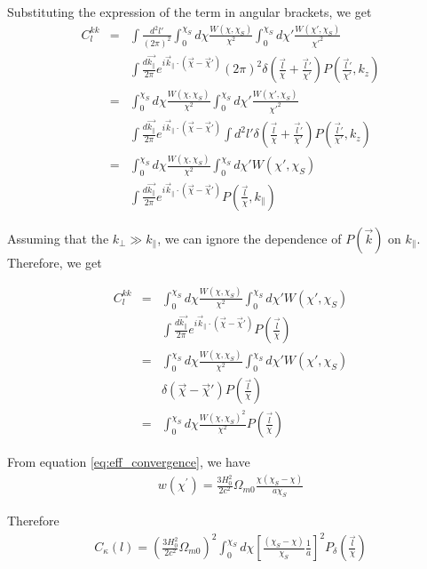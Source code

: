 \documentclass[12pt]{article}
\newcommand{\beqa}{\begin{eqnarray}}
\newcommand{\eeqa}{\end{eqnarray}}
\numberwithin{equation}{section}
\begin{document}
Substituting the expression of the term in angular brackets, we get
\begin{eqnarray}
C_l^{kk} &=& \int \frac{d^2 l'}{(2\pi)^2} \int_0^{\chi_S} d\chi \frac{W(\chi, \chi_S)}{\chi^2} \int_0^{\chi_S} d\chi' \frac{W(\chi', \chi_S)}{\chi'^2} 
\\  
&&  \int \frac{d\vec{k_\parallel}}{2\pi} e^{i\vec{k}_\parallel \cdot (\vec{\chi} - \vec{\chi}')}  (2\pi)^2 \delta(\frac{\vec{l}}{\chi} + \frac{\vec{l}'}{\chi'}) P(\frac{\vec{l}'}{\chi'}, k_z) 
\\
&=& \int_0^{\chi_S} d\chi \frac{W(\chi, \chi_S)}{\chi^2} \int_0^{\chi_S} d\chi' \frac{W(\chi', \chi_S)}{\chi'^2} 
\\  
&&  \int \frac{d\vec{k_\parallel}}{2\pi} e^{i\vec{k}_\parallel \cdot (\vec{\chi} - \vec{\chi}')}  \int d^2 l'\delta(\frac{\vec{l}}{\chi} + \frac{\vec{l}'}{\chi'}) P(\frac{\vec{l}'}{\chi'}, k_z) 
\\
&=& \int_0^{\chi_S} d\chi \frac{W(\chi, \chi_S)}{\chi^2} \int_0^{\chi_S} d\chi' W(\chi', \chi_S)
\\  
&&  \int \frac{d\vec{k_\parallel}}{2\pi} e^{i\vec{k}_\parallel \cdot (\vec{\chi} - \vec{\chi}')} P(\frac{\vec{l}}{\chi}, k_\parallel) 
\end{eqnarray}

Assuming that the $ k_\perp \gg k_\parallel $, we can ignore the dependence of $ P(\vec{k}) $ on $ k_\parallel $. Therefore, we get

\begin{eqnarray}
C_l^{kk}
&=& \int_0^{\chi_S} d\chi \frac{W(\chi, \chi_S)}{\chi^2} \int_0^{\chi_S} d\chi' W(\chi', \chi_S)
\\  
&&  \int \frac{d\vec{k_\parallel}}{2\pi} e^{i\vec{k}_\parallel \cdot (\vec{\chi} - \vec{\chi}')} P(\frac{\vec{l}}{\chi}) 
\\
&=& \int_0^{\chi_S} d\chi \frac{W(\chi, \chi_S)}{\chi^2} \int_0^{\chi_S} d\chi' W(\chi', \chi_S)
\\  
&&  \delta(\vec{\chi} - \vec{\chi}') P(\frac{\vec{l}}{\chi}) 
\\
&=& \int_0^{\chi_S} d\chi \frac{W(\chi, \chi_S)^2}{\chi^2}  P(\frac{\vec{l}}{\chi}) 
\end{eqnarray}

From equation \ref{eq:eff_convergence}, we have 
\beqa
w(\chi^\prime) = \frac{3 H_0^2}{2c^2} \Omega_{m0} \frac{\chi (\chi_S - \chi)}{a \chi_S}
\eeqa

Therefore
\begin{eqnarray}
C_\kappa(l) = \left(\frac{3 H_0^2}{2c^2} \Omega_{m0} \right)^2 \int_0^{\chi_S} d\chi \left[ \frac{(\chi_S - \chi)}{\chi_S} \frac{1}{a} \right]^2 P_\delta\left( \frac{\vec{l}}{\chi}\right) \label{eq:converg_ang_pow_spec}
\end{eqnarray}
\end{document}
